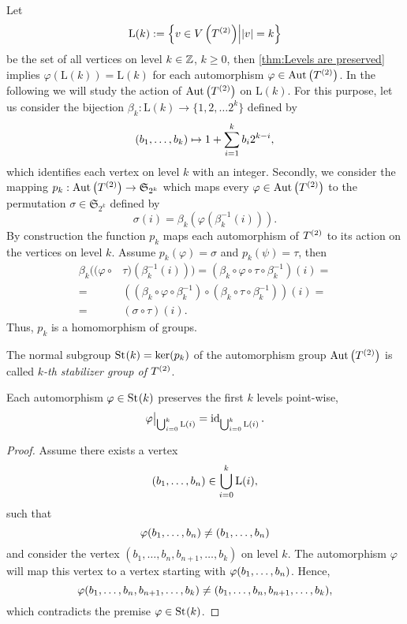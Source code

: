 Let
\begin{equation*}
\mathrm{L}(k):=\left\lbrace v\in\VT\middle\vert \lvert v\rvert=k\right\rbrace
\end{equation*}
be the set of all vertices on level $k\in\Z$, $k\geq 0$,  then \cref{thm:Levels are preserved} implies $\varphi(\mathrm{L}(k))=\mathrm{L}(k)$ for each automorphism $\varphi\in\AutT$. In the following we will study the action of $\AutT$ on $\mathrm{L}(k)$. For this purpose, let us consider the bijection $\beta_k\colon\mathrm{L}(k)\to\lbrace 1,2,\ldots 2^k\rbrace$ defined by 
\begin{equation*}
(\seq[k]{b})\mapsto 1+\sum_{i=1}^{k} b_i2^{k-i},
\end{equation*}
which identifies each vertex on level $k$ with an integer. Secondly, we consider the mapping $p_k:\AutT\to\mathfrak{S}_{2^k}$ which maps every $\varphi\in\AutT$ to the permutation $\sigma\in\mathfrak{S}_{2^k}$ defined by
\begin{equation*}
\sigma(i)=\beta_k(\varphi(\beta_k^{-1}(i))).
\end{equation*}
By construction the function $p_k$ maps each automorphism of $\T$ to its action on the vertices on level $k$. Assume $p_k(\varphi)=\sigma$ and $p_k(\psi)=\tau$, then
\begin{align*}
\beta_k((\varphi\circ&\tau)(\beta_k^{-1}(i)))=(\beta_k\circ\varphi\circ\tau\circ \beta_k^{-1})(i)=\\
=&((\beta_k\circ\varphi\circ \beta_k^{-1})\circ(\beta_k\circ\tau\circ \beta_k^{-1}))(i)=\\
=&(\sigma\circ\tau)(i).
\end{align*}
Thus, $p_k$ is a homomorphism of groups.

\begin{defin}\label{def:Stabilizer Group}
The normal subgroup $\St{k}=\ker(p_k)$ of the automorphism group $\AutT$ is called \textit{$k$-th stabilizer group of $\T$}.
\end{defin}

\begin{pro}
Each automorphism $\varphi\in\St{k}$ preserves the first $k$ levels point-wise, \ie
\begin{equation*}
\varphi\big\vert_{\bigcup_{i=0}^k\mathrm{L}(i)}=\id_{\bigcup_{i=0}^k\mathrm{L}(i)}.
\end{equation*}
\end{pro}
\begin{proof}
Assume there exists a vertex 
\begin{equation*}
(\seq{b})\in\bigcup_{i=0}^k\mathrm{L}(i),
\end{equation*}
such that 
\begin{equation*}
\varphi(\seq{b})\neq (\seq{b})
\end{equation*}
and consider the vertex $(b_1,\ldots,b_n,b_{n+1},\ldots,b_k)$ on level $k$. The automorphism $\varphi$ will map this vertex to a vertex starting with $\varphi(\seq{b})$. Hence, 
\begin{equation*}
\varphi(\seq{b},b_{n+1},\ldots,b_k)\neq(b_1,\ldots,b_n,b_{n+1},\ldots,b_k),
\end{equation*}
which contradicts the premise $\varphi\in\St{k}$. 
\end{proof}